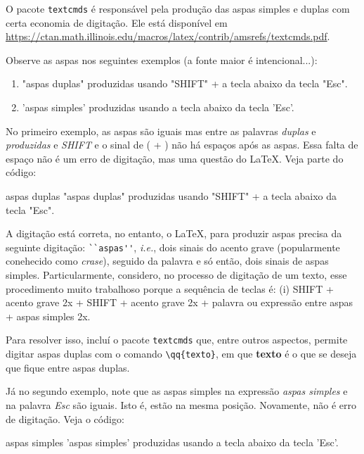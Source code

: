 \documentclass[a4paper,12pt,oneside]{memoir}
\begin{document}
O pacote \verb|textcmds| é responsável pela produção das aspas simples e duplas com certa economia de digitação. Ele está disponível em \url{https://ctan.math.illinois.edu/macros/latex/contrib/amsrefs/textcmds.pdf}.

Observe as aspas nos seguintes exemplos (a fonte maior é intencional...):

\begin{enumerate}
	\item {\LARGE "aspas duplas" produzidas usando "SHIFT" + a tecla abaixo da tecla "Esc".}
	\item {\LARGE 'aspas simples' produzidas usando a tecla abaixo da tecla 'Esc'.}
\end{enumerate}

No primeiro exemplo, as aspas são iguais mas entre as palavras \textit{duplas} e \textit{produzidas} e \textit{SHIFT} e o sinal de ( + ) não há espaços após as aspas. Essa falta de espaço não é um erro de digitação, mas uma questão do \LaTeX. Veja parte do código:

\begin{codex}{aspas duplas}
{\LARGE "aspas duplas" produzidas usando "SHIFT" + a tecla abaixo da tecla "Esc".}
\end{codex}

A digitação está correta, no entanto, o \LaTeX, para produzir aspas precisa da seguinte digitação: \verb|``aspas''|, \textit{i.e.}, dois sinais do acento grave (popularmente conehecido como \textit{crase}), seguido da palavra e só então, dois sinais de aspas simples. Particularmente, considero, no processo de digitação de um texto, esse procedimento muito trabalhoso porque a sequência de teclas é: (i) SHIFT + acento grave 2x + SHIFT + acento grave 2x + palavra ou expressão entre aspas + aspas simples 2x.

Para resolver isso, incluí o pacote \verb|textcmds| que, entre outros aspectos, permite digitar aspas duplas com o comando \verb|\qq{texto}|, em que \textbf{texto} é o que se deseja que fique entre aspas duplas.

Já no segundo exemplo, note que as aspas simples na expressão \textit{aspas simples} e na palavra \textit{Esc} são iguais. Isto é, estão na mesma posição. Novamente, não é erro de digitação. Veja o código:

\begin{codex}{aspas simples}
{\LARGE 'aspas simples' produzidas usando a tecla abaixo da tecla 'Esc'.}
\end{codex}
\end{document}
